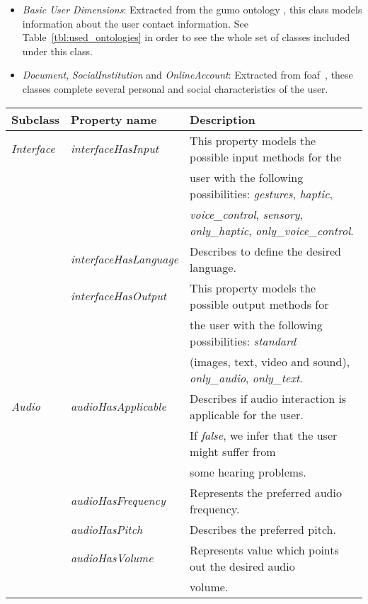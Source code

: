 \begin{itemize}
  \item \textit{Basic User Dimensions}: Extracted from the \ac{gumo} ontology
  \citep{heckmann_gumogeneral_2005}, this class models information about the user
  contact information. See Table~\ref{tbl:used_ontologies} in order to see the
  whole set of classes included under this class.
  
  \item \textit{Document}, \textit{SocialInstitution} and \textit{OnlineAccount}:
  Extracted from \ac{foaf}~\citep{foaf}, these classes complete several personal 
  and social characteristics of the user.
\end{itemize}



\begin{center}
\footnotesize
\begin{longtable}{l l l}
  
  \label{tbl:user_characteristics_ontology} \\
  \hline 
  \textbf{Subclass} 	& \textbf{Property name} 	& \textbf{Description}							\\
  \hline
  \textit{Interface}	& \textit{interfaceHasInput}	& This property models the possible input methods for the		\\
			& 				& user with the following possibilities: \textit{gestures}, \textit{haptic},\\
			& 				& \textit{voice\_control}, \textit{sensory}, \textit{only\_haptic}, \textit{only\_voice\_control}.\\
			& \textit{interfaceHasLanguage}	& Describes to define the desired language. 				\\
			& \textit{interfaceHasOutput}	& This property models the possible output  methods for 		\\
			& 				& the user with the following possibilities: \textit{standard}  	\\
			& 				& (images, text, video and sound), \textit{only\_audio}, \textit{only\_text}.	\\
  
  \textit{Audio}	& \textit{audioHasApplicable}	& Describes if audio interaction is applicable for the user. 		\\ 
			& 				& If \textit{false}, we infer that the user might suffer from		\\
  			& 				& some hearing problems.						\\
  			& \textit{audioHasFrequency}	& Represents the preferred audio frequency. 				\\
  			& \textit{audioHasPitch}	& Describes the preferred pitch. 					\\
  			& \textit{audioHasVolume}	& Represents value which points out the desired audio 			\\
  			&				& volume.								\\
  			

\end{longtable}
\end{center}
